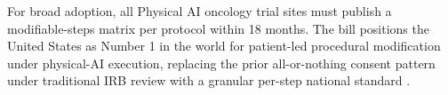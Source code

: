 For broad adoption, all Physical AI oncology trial sites must
publish a modifiable-steps matrix per protocol within 18 months. The
bill positions the United States as Number 1 in the world for
patient-led procedural modification under physical-AI execution,
replacing the prior all-or-nothing consent pattern under traditional
IRB review with a granular per-step national standard
\cite{kawchak_2026_18973368, kawchak_2026_19119939}.
